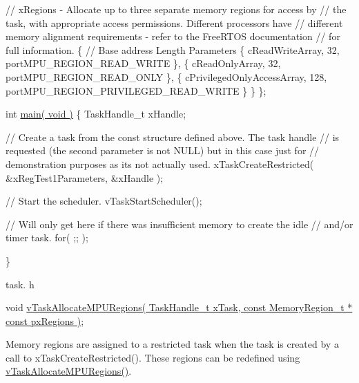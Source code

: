 \begin{DoxyPre}    // xRegions - Allocate up to three separate memory regions for access by
    // the task, with appropriate access permissions.  Different processors have
    // different memory alignment requirements - refer to the FreeRTOS documentation
    // for full information.
    \{
        // Base address                 Length  Parameters
        \{ cReadWriteArray,              32,     portMPU\_REGION\_READ\_WRITE \},
        \{ cReadOnlyArray,               32,     portMPU\_REGION\_READ\_ONLY \},
        \{ cPrivilegedOnlyAccessArray,   128,    portMPU\_REGION\_PRIVILEGED\_READ\_WRITE \}
    \}
\};\end{DoxyPre}



\begin{DoxyPre}int \hyperlink{demo_2microchip_2pic32mz__ef__curiosity_2wifi__http__server__demo_2src_2main_8c_ac5a1eca594b063e0d2dbccf86f96f221}{main( void )}
\{
TaskHandle\_t xHandle;
\begin{DoxyVerb}// Create a task from the const structure defined above.  The task handle
// is requested (the second parameter is not NULL) but in this case just for
// demonstration purposes as its not actually used.
xTaskCreateRestricted( &xRegTest1Parameters, &xHandle );

// Start the scheduler.
vTaskStartScheduler();

// Will only get here if there was insufficient memory to create the idle
// and/or timer task.
for( ;; );
\end{DoxyVerb}

\}
   \end{DoxyPre}


task. h 
\begin{DoxyPre}
 void \hyperlink{task_8h_ad889595baff9faf9efe02f3696825409}{vTaskAllocateMPURegions( TaskHandle\_t xTask, const MemoryRegion\_t * const pxRegions )};\end{DoxyPre}


Memory regions are assigned to a restricted task when the task is created by a call to x\+Task\+Create\+Restricted(). These regions can be redefined using \hyperlink{task_8h_ad889595baff9faf9efe02f3696825409}{v\+Task\+Allocate\+M\+P\+U\+Regions()}.



